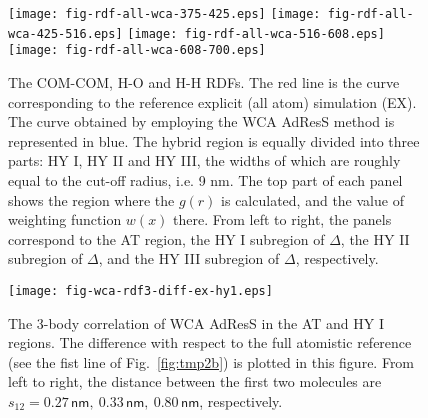 \documentclass[aip,jcp,a4paper,reprint,onecolumn]{revtex4-1}
\newcommand{\redc}[1]{{\color{red} #1}}
\begin{document}
\begin{figure}
  \centering
  \texttt{[image: fig-rdf-all-wca-375-425.eps]}
  \texttt{[image: fig-rdf-all-wca-425-516.eps]}
  \texttt{[image: fig-rdf-all-wca-516-608.eps]}
  \texttt{[image: fig-rdf-all-wca-608-700.eps]}
  \caption{
    The COM-COM, H-O and H-H RDFs. 
    The red line is the curve corresponding to the reference explicit (all atom)
    simulation (EX).
    The curve obtained by employing the WCA AdResS 
    method is represented in blue.
    The hybrid region is equally
    divided into three parts: HY I, HY II and HY III, the widths of
    which are roughly equal to the cut-off radius, i.e. 9 \textsf{nm}.    
    The top part of each panel shows the region where the $g(r)$ is calculated,
    and the value of weighting function $w(x)$ there.
    From left to right, the panels correspond to the AT region, 
    the HY I subregion of $\Delta$,
    the HY II subregion of $\Delta$,
    and the HY III subregion of $\Delta$, respectively. 
  }
  \label{fig:wca-dist}
\end{figure}

\begin{figure}
  \centering
  \texttt{[image: fig-wca-rdf3-diff-ex-hy1.eps]}
  \caption{The 3-body correlation of WCA AdResS in the AT
    and HY I regions.
    The difference with respect to the full atomistic reference
    (see the fist line of Fig.~\ref{fig:tmp2b})
    is plotted in this figure. From left to right, the distance
    between the first two molecules are \redc{$s_{12} =
    0.27\,\textsf{nm},\ 0.33\,\textsf{nm},\  
    0.80\,\textsf{nm}$, respectively.}
  }
  \label{fig:wca-g3}
\end{figure}
\end{document}
